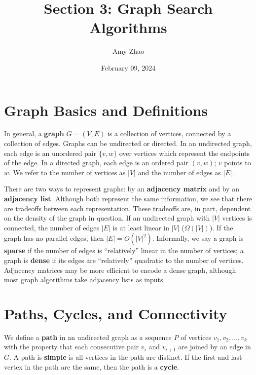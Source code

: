 \documentclass[11pt]{article}
\title{Section 3: Graph Search Algorithms}
\date{February 09, 2024}
\author{Amy Zhao}
\begin{document}
\renewcommand\labelitemi{$\vcenter{\hbox{\tiny$\bullet$}}$}
\renewcommand\labelitemii{$\vcenter{\hbox{\tiny$\bullet$}}$}


\maketitle

\section{Graph Basics and Definitions}
In general, a \textbf{graph} $G = (V, E)$ is a collection of vertices, connected by a collection of edges. Graphs can be undirected or directed. In an undirected graph, each edge is an unordered pair $\{v, w\}$ over vertices which represent the endpoints of the edge. In a directed graph, each edge is an ordered pair $(v, w)$; $v$ points to $w$. We refer to the number of vertices as $|V|$ and the number of edges as $|E|$. 

There are two ways to represent graphs: by an \textbf{adjacency matrix} and by an \textbf{adjacency list}. Although both represent the same information, we see that there are tradeoffs between each representation. These tradeoffs are, in part, dependent on the density of the graph in question. If an undirected graph with $|V|$ vertices is connected, the number of edges $|E|$ is at least linear in $|V|$ ($\Omega(|V|)$). If the graph has no parallel edges, then $|E| = O(|V|^2)$. Informally, we say a graph is \textbf{sparse} if the number of edges is ``relatively'' linear in the number of vertices; a graph is \textbf{dense} if its edges are ``relatively'' quadratic to the number of vertices. Adjacency matrices may be more efficient to encode a dense graph, although most graph algorithms take adjacency lists as inputs.

\section{Paths, Cycles, and Connectivity}
We define a \textbf{path} in an undirected graph as a sequence $P$ of vertices $v_1, v_2, \dots, v_k$ with the property that each consecutive pair $v_i$ and $v_{i + 1}$ are joined by an edge in $G$. A path is \textbf{simple} is all vertices in the path are distinct. If the first and last vertex in the path are the same, then the path is a \textbf{cycle}.
\end{document}
